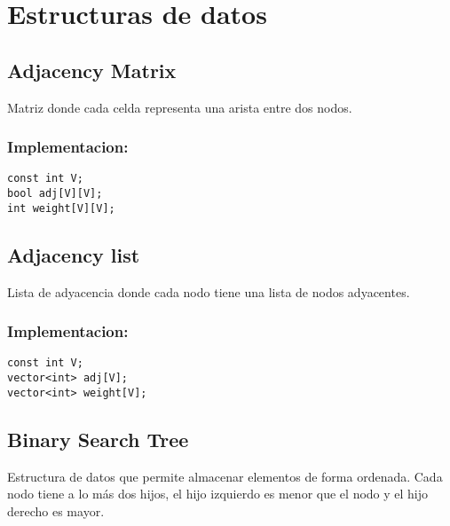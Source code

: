 \section{Estructuras de datos}
\label{sec:estructuras_de_datos}

\subsection{Adjacency Matrix}
\label{subsec:adjacency_matrix}
Matriz donde cada celda representa una arista entre dos nodos. 

\subsubsection{Implementacion:}
\begin{lstlisting}[style=cpp]
const int V;
bool adj[V][V];
int weight[V][V];
\end{lstlisting}

\subsection{Adjacency list}
\label{subsec:adjacency_list}
Lista de adyacencia donde cada nodo tiene una lista de nodos adyacentes.

\subsubsection{Implementacion:}
\begin{lstlisting}[style=cpp]
const int V;
vector<int> adj[V];
vector<int> weight[V];
\end{lstlisting}

\subsection{Binary Search Tree}
\label{subsec:binary_search_tree}
Estructura de datos que permite almacenar elementos de forma ordenada. Cada nodo tiene a lo más dos hijos, el hijo izquierdo es menor que el nodo y el hijo derecho es mayor. 

